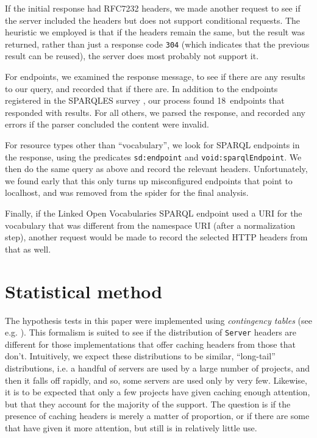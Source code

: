 \documentclass[a4paper,english]{article}
\newcommand{\rdfterm}[1]{\texttt{#1}}
\newcommand{\httph}[1]{\texttt{#1}}
\begin{document}
If the initial response had RFC7232 headers, we made another
request to see if the server included the headers but does not
support conditional requests. The heuristic we employed is
that if the headers remain the same, but the result was returned,
rather than just a response code \httph{304} (which indicates that the
previous result can be reused), the server does most probably not
support it.

For endpoints, we examined the response message, to see if there are
any results to our query, and recorded that if there are. In addition
to the endpoints registered in the SPARQLES survey
\cite{buil2013sparql}, our process found 18~endpoints that responded
with results. For all others, we parsed the response, and recorded any
errors if the parser concluded the content were invalid.

For resource types other than ``vocabulary'', we look for SPARQL
endpoints in the response, using the predicates \rdfterm{sd:endpoint}
and \rdfterm{void:sparqlEndpoint}. We then do the same query as above
and record the relevant headers. Unfortunately, we found early that
this only turns up misconfigured endpoints that point to localhost,
and was removed from the spider for the final analysis.

Finally, if the Linked Open Vocabularies \cite{lov2} SPARQL endpoint
used a URI for the vocabulary that was different from the namespace
URI (after a normalization step), another request would be made to
record the selected HTTP headers from that as well.

\section{Statistical method}\label{app:stats}

The hypothesis tests in this paper were implemented using \emph{contingency
  tables} (see e.g. \cite{kn:bj}). This formalism is suited to see if the
distribution of  \httph{Server} headers are different for those implementations that
offer caching headers from those that don't. Intuitively, we expect
these distributions to be similar, ``long-tail'' distributions, i.e. a
handful of servers are used by a large number of projects, and then it
falls off rapidly, and so, some servers are used only by very
few. Likewise, it is to be expected that only a few projects have
given caching enough attention, but that they account for the majority
of the support. The question is if the presence of caching headers is
merely a matter of proportion, or if there are some that have given it
more attention, but still is in relatively little use.
\end{document}
